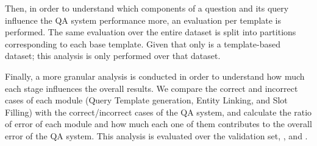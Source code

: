 Then, in order to understand which components of a question and its \SPARQL{} query influence the 
QA system performance more, an evaluation per template is performed. The same evaluation over 
the entire dataset is split into partitions corresponding to each \LCQuADtwo{} base template. Given 
that only \LCQuADtwo{} is a template-based dataset; this analysis is only performed over that 
dataset.

Finally, a more granular analysis is conducted in order to understand how much each stage 
influences the overall results. We compare the correct and incorrect cases of each module (Query 
Template generation, Entity Linking, and Slot Filling) with the correct/incorrect cases of the 
QA system, and calculate the ratio of error of each module and how much each one of them 
contributes to the overall error of the QA system. This analysis is evaluated over the \LCQuADtwo{} 
validation set, \QALDseven{}, and \WikiSPARQL{}.
